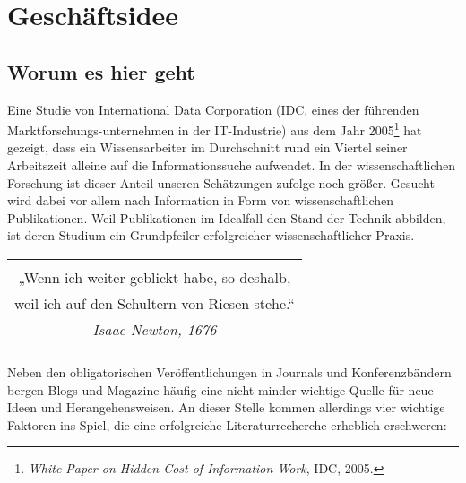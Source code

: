 \section{Geschäftsidee}


\subsection{Worum es hier geht}
Eine Studie von International Data Corporation (IDC, eines der führenden Marktforschungs-unternehmen in der IT-Industrie) aus dem Jahr 2005\footnote[1]{\textit{White Paper on Hidden Cost of Information Work}, IDC, 2005.} hat gezeigt, dass ein Wissensarbeiter im Durchschnitt rund ein Viertel seiner Arbeitszeit alleine auf die Informationssuche aufwendet. In der wissenschaftlichen Forschung ist dieser Anteil unseren Schätzungen zufolge noch größer. Gesucht wird dabei vor allem nach Information in Form von wissenschaftlichen Publikationen. Weil Publikationen im Idealfall den Stand der Technik abbilden, ist deren Studium ein Grundpfeiler erfolgreicher wissenschaftlicher Praxis. 

\begin{table}[h!]
  \centering
  \begin{large}
	\begin{itshape}
  \begin{tabular}{c}\hline
	\\
  {\color{orange}„Wenn ich weiter geblickt habe, so deshalb,} \\ 
	{\color{orange}weil ich auf den Schultern von Riesen stehe.“} \\
	{\hfill \color{orange}\textit{Isaac Newton, 1676} } \\
	\\\hline
  \end{tabular}
	\end{itshape}
  \end{large}
\end{table}

Neben den obligatorischen Veröffentlichungen in Journals und Konferenzbändern bergen Blogs und Magazine häufig eine nicht minder wichtige Quelle für neue Ideen und Herangehensweisen. An dieser Stelle kommen allerdings vier wichtige Faktoren ins Spiel, die eine erfolgreiche Literaturrecherche erheblich erschweren: 

